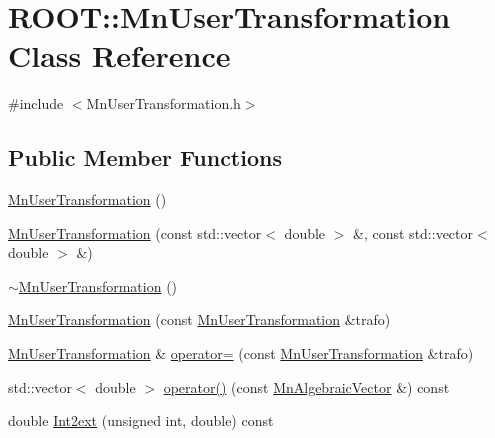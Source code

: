 \hypertarget{classROOT_1_1Minuit2_1_1MnUserTransformation}{}\section{R\+O\+OT\+:\+:Mn\+User\+Transformation Class Reference}
\label{classROOT_1_1Minuit2_1_1MnUserTransformation}


{\ttfamily \#include $<$Mn\+User\+Transformation.\+h$>$}

\subsection*{Public Member Functions}
\begin{DoxyCompactItemize}
\item 
\mbox{\hyperlink{classROOT_1_1Minuit2_1_1MnUserTransformation_aabec69c71600612db11554ed60a76e21}{Mn\+User\+Transformation}} ()
\item 
\mbox{\hyperlink{classROOT_1_1Minuit2_1_1MnUserTransformation_a75c58c9381f8c42adcee7319d2671918}{Mn\+User\+Transformation}} (const std\+::vector$<$ double $>$ \&, const std\+::vector$<$ double $>$ \&)
\item 
\mbox{\hyperlink{classROOT_1_1Minuit2_1_1MnUserTransformation_a1510c72a07c9d089f16a4536ceacde56}{$\sim$\+Mn\+User\+Transformation}} ()
\item 
\mbox{\hyperlink{classROOT_1_1Minuit2_1_1MnUserTransformation_ae2bba4ce251f0eab8719900620addef9}{Mn\+User\+Transformation}} (const \mbox{\hyperlink{classROOT_1_1Minuit2_1_1MnUserTransformation}{Mn\+User\+Transformation}} \&trafo)
\item 
\mbox{\hyperlink{classROOT_1_1Minuit2_1_1MnUserTransformation}{Mn\+User\+Transformation}} \& \mbox{\hyperlink{classROOT_1_1Minuit2_1_1MnUserTransformation_a54aa66bb6edb8264484b6ece788b903c}{operator=}} (const \mbox{\hyperlink{classROOT_1_1Minuit2_1_1MnUserTransformation}{Mn\+User\+Transformation}} \&trafo)
\item 
std\+::vector$<$ double $>$ \mbox{\hyperlink{classROOT_1_1Minuit2_1_1MnUserTransformation_a5b4f45e11a5497d548e4b3e9dec95c6d}{operator()}} (const \mbox{\hyperlink{namespaceROOT_1_1Minuit2_a62ed97730a1ca8d3fbaec64a19aa11c9}{Mn\+Algebraic\+Vector}} \&) const
\item 
double \mbox{\hyperlink{classROOT_1_1Minuit2_1_1MnUserTransformation_aa05e327d2e4376c0e1db865ba92becdd}{Int2ext}} (unsigned int, double) const

\end{DoxyCompactItemize}
